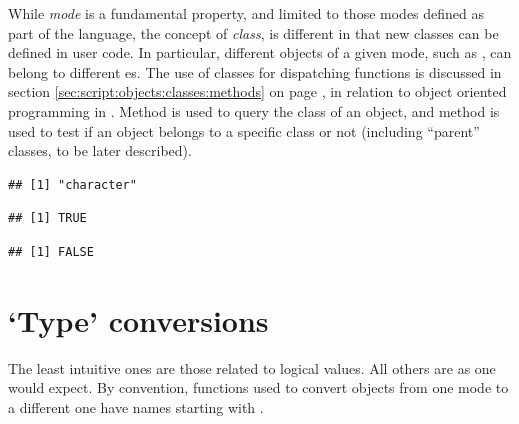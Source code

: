 \documentclass[krantz2]{krantz}\usepackage{knitr}%
\begin{document}
While \emph{mode} is a fundamental property, and limited to those modes defined as part of the \Rlang language, the concept of \emph{class}, is different in that new classes can be defined in user code. In particular, different \Rlang objects of a given mode, such as , can belong to different es. The use of classes for dispatching functions is discussed in section \ref{sec:script:objects:classes:methods} on page \pageref{sec:script:objects:classes:methods}, in relation to object oriented programming in \Rlang. Method  is used to query the class of an object, and method  is used to test if an object belongs to a specific class or not (including ``parent'' classes, to be later described).

\begin{knitrout}\footnotesize
{}\color{fgcolor}\begin{kframe}
\begin{alltt}
\end{alltt}
\begin{verbatim}
## [1] "character"
\end{verbatim}
\begin{alltt}
 \hlstd{)}
\end{alltt}
\begin{verbatim}
## [1] TRUE
\end{verbatim}
\begin{alltt}
 \hlstd{)}
\end{alltt}
\begin{verbatim}
## [1] FALSE
\end{verbatim}
\end{kframe}
\end{knitrout}

\section{`Type' conversions}
The least intuitive ones are those related to logical values. All others are as one would expect. By convention, functions used to convert objects from one mode to a different one have names starting with .
\end{document}
